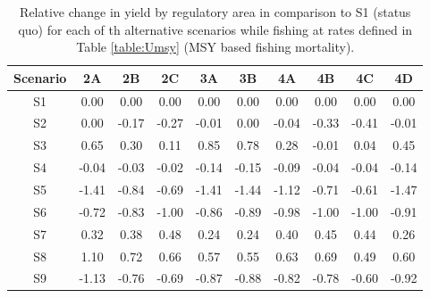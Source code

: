 \begin{table}
	\caption{Relative change in yield by regulatory area in comparison to S1 (status quo) for each of th alternative scenarios while fishing at rates defined in Table \ref{table:Umsy} (MSY based fishing mortality).}
	\label{table:MSY}
	\begin{center}
		\begin{tabular}{c|ccccccccc}
		\hline
		Scenario & 2A & 2B & 2C & 3A & 3B & 4A & 4B & 4C & 4D\\
		\hline
		S1&  0.00&  0.00&  0.00&  0.00&  0.00&  0.00&  0.00&  0.00&  0.00 \\
		S2&  0.00& -0.17& -0.27& -0.01&  0.00& -0.04& -0.33& -0.41& -0.01 \\
		S3&  0.65&  0.30&  0.11&  0.85&  0.78&  0.28& -0.01&  0.04&  0.45 \\
		S4& -0.04& -0.03& -0.02& -0.14& -0.15& -0.09& -0.04& -0.04& -0.14 \\
		S5& -1.41& -0.84& -0.69& -1.41& -1.44& -1.12& -0.71& -0.61& -1.47 \\
		S6& -0.72& -0.83& -1.00& -0.86& -0.89& -0.98& -1.00& -1.00& -0.91 \\
		S7&  0.32&  0.38&  0.48&  0.24&  0.24&  0.40&  0.45&  0.44&  0.26 \\
		S8&  1.10&  0.72&  0.66&  0.57&  0.55&  0.63&  0.69&  0.49&  0.60 \\
		S9& -1.13& -0.76& -0.69& -0.87& -0.88& -0.82& -0.78& -0.60& -0.92 \\
		\hline
		\end{tabular}
	\end{center}
\end{table}

